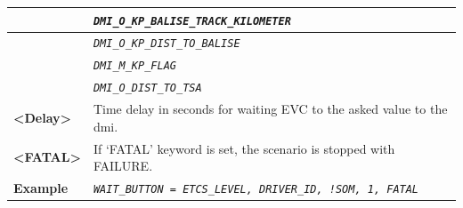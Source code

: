 \documentclass{template/openetcs}
\begin{document}
\begin{itemize}
\begin{longtable}{|l|l|}
				\hline
				
				&	\begin{minipage}[t]{0.78\linewidth} \emph{\texttt{DMI\_O\_KP\_BALISE\_TRACK\_KILOMETER}} \end{minipage} \\
				
				\hline
				
				&	\begin{minipage}[t]{0.78\linewidth} \emph{\texttt{DMI\_O\_KP\_DIST\_TO\_BALISE}} \end{minipage} \\
				
				\hline
				
				&	\begin{minipage}[t]{0.78\linewidth} \emph{\texttt{DMI\_M\_KP\_FLAG}} \end{minipage} \\
				
				\hline
				
				&	\begin{minipage}[t]{0.78\linewidth} \emph{\texttt{DMI\_O\_DIST\_TO\_TSA}} \end{minipage} \\
				
				\hline				
								
					\begin{minipage}[t]{0.22\linewidth} \textbf{<Delay>} \end{minipage}
				&	\begin{minipage}[t]{0.78\linewidth} Time delay in seconds for waiting EVC to the asked value to the dmi. \end{minipage} \\
				
				\hline
				
					\begin{minipage}[t]{0.22\linewidth} \textbf{<FATAL>} \end{minipage}
				&	\begin{minipage}[t]{0.78\linewidth} If ‘FATAL’ keyword is set, the scenario is stopped with FAILURE.  \end{minipage} \\
				
				\hline							
															
					\begin{minipage}[t]{0.22\linewidth} \textbf{Example} \end{minipage}
				&	\begin{minipage}[t]{0.78\linewidth} \emph{\texttt{WAIT\_BUTTON = ETCS\_LEVEL, DRIVER\_ID, !SOM, 1, FATAL}} \end{minipage} \\
				
				\hline \hline
				
			\end{longtable}
\end{itemize}
\end{document}
